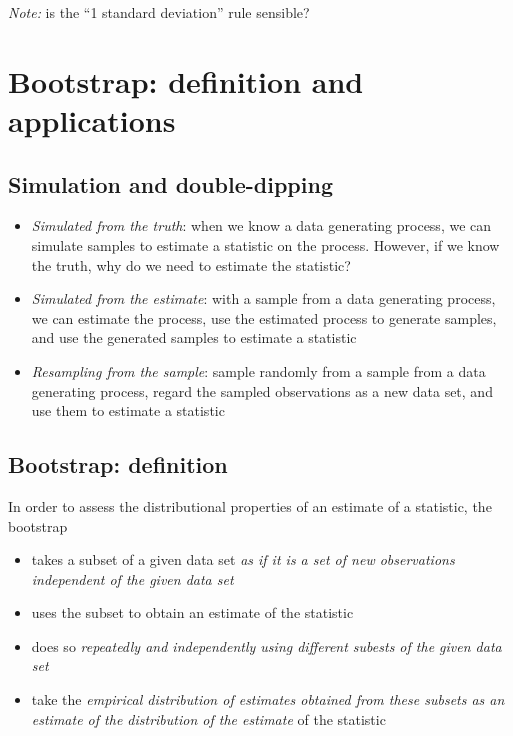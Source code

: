 \documentclass[]{article}
\providecommand{\tightlist}{%
  \setlength{\itemsep}{0pt}\setlength{\parskip}{0pt}}
\begin{document}
\emph{Note:} is the ``1 standard deviation'' rule sensible?

\section{Bootstrap: definition and
applications}\label{bootstrap-definition-and-applications}

\subsection{Simulation and
double-dipping}\label{simulation-and-double-dipping}

\begin{itemize}
\tightlist
\item
  \emph{Simulated from the truth}: when we know a data generating
  process, we can simulate samples to estimate a statistic on the
  process. However, if we know the truth, why do we need to estimate the
  statistic?
\item
  \emph{Simulated from the estimate}: with a sample from a data
  generating process, we can estimate the process, use the estimated
  process to generate samples, and use the generated samples to estimate
  a statistic
\item
  \emph{Resampling from the sample}: sample randomly from a sample from
  a data generating process, regard the sampled observations as a new
  data set, and use them to estimate a statistic
\end{itemize}

\subsection{Bootstrap: definition}\label{bootstrap-definition}

In order to assess the distributional properties of an estimate of a
statistic, the bootstrap

\begin{itemize}
\tightlist
\item
  takes a subset of a given data set \emph{as if it is a set of new
  observations independent of the given data set}
\item
  uses the subset to obtain an estimate of the statistic
\item
  does so \emph{repeatedly and independently using different subests of
  the given data set}
\item
  take the \emph{empirical distribution of estimates obtained from these
  subsets as an estimate of the distribution of the estimate} of the
  statistic
\end{itemize}
\end{document}
